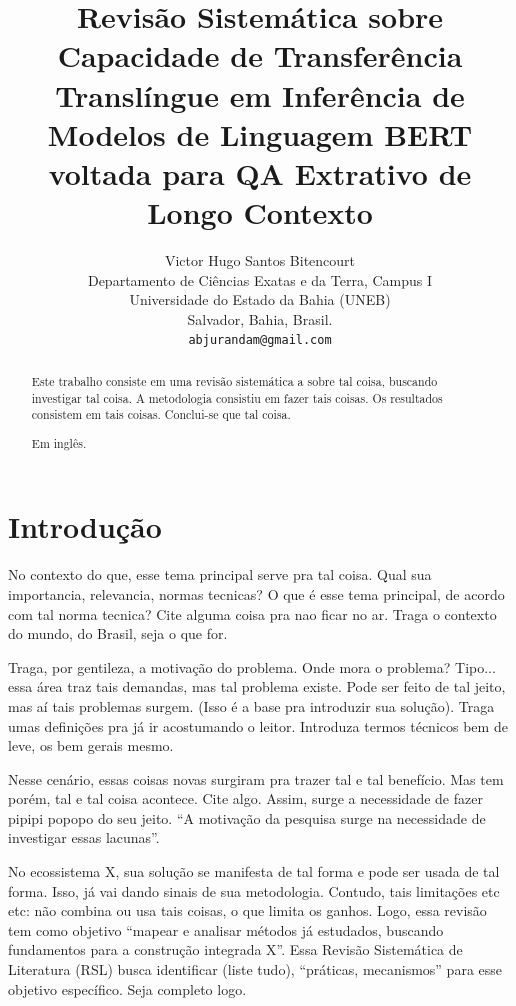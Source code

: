 \documentclass[12pt,a4paper]{article}
\title{\textbf{Revisão Sistemática sobre Capacidade de Transferência Translíngue em Inferência de Modelos de Linguagem BERT voltada para QA Extrativo de Longo Contexto}}
\author{
    Victor Hugo Santos Bitencourt \\
    Departamento de Ciências Exatas e da Terra, Campus I \\
    Universidade do Estado da Bahia (UNEB) \\
    Salvador, Bahia, Brasil. \\
    \texttt{abjurandam@gmail.com}
}
\date{}
\newenvironment{resumo}{%
  \otherlanguage{brazil}%
  \renewcommand{\abstractname}{Resumo}%
  \begin{abstract}%
}{%
  \end{abstract}%
}
\begin{document}
\maketitle

\begin{resumo}
Este trabalho consiste em uma revisão sistemática a sobre tal coisa, buscando investigar tal coisa. A metodologia consistiu em fazer tais coisas. Os resultados consistem em tais coisas. Conclui-se que tal coisa.
\end{resumo}

\begin{otherlanguage}{english}
\begin{abstract}
Em inglês.
\end{abstract}
\end{otherlanguage}

\section{Introdução}
No contexto do que, esse tema principal serve pra tal coisa. Qual sua importancia, relevancia, normas tecnicas? O que é esse tema principal, de acordo com tal norma tecnica? Cite alguma coisa pra nao ficar no ar. Traga o contexto do mundo, do Brasil, seja o que for.

Traga, por gentileza, a motivação do problema. Onde mora o problema? Tipo... essa área traz tais demandas, mas tal problema existe. Pode ser feito de tal jeito, mas aí tais problemas surgem. (Isso é a base pra introduzir sua solução). Traga umas definições pra já ir acostumando o leitor. Introduza termos técnicos bem de leve, os bem gerais mesmo.

Nesse cenário, essas coisas novas surgiram pra trazer tal e tal benefício. Mas tem porém, tal e tal coisa acontece. Cite algo. Assim, surge a necessidade de fazer pipipi popopo do seu jeito. ``A motivação da pesquisa surge na necessidade de investigar essas lacunas''.

No ecossistema X, sua solução se manifesta de tal forma e pode ser usada de tal forma. Isso, já vai dando sinais de sua metodologia. Contudo, tais limitações etc etc: não combina ou usa tais coisas, o que limita os ganhos. Logo, essa revisão tem como objetivo ``mapear e analisar métodos já estudados, buscando fundamentos para a construção integrada X''. Essa Revisão Sistemática de Literatura (RSL) busca identificar (liste tudo), ``práticas, mecanismos'' para esse objetivo específico. Seja completo logo.
\end{document}
